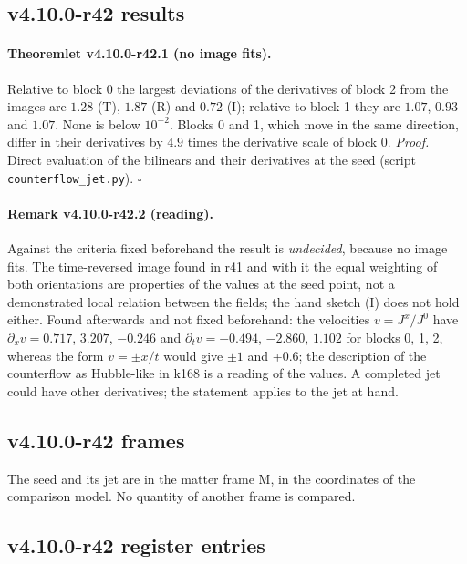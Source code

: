 \subsection*{v4.10.0-r42 results}
\label{subsec:v4100-r42-results}

\paragraph{Theoremlet v4.10.0-r42.1 (no image fits).}
Relative to block 0 the largest deviations of the derivatives of block 2 from the images are \(1.28\) (T), \(1.87\) (R) and \(0.72\) (I); relative to block 1
they are \(1.07\), \(0.93\) and \(1.07\).  None is below \(10^{-2}\).  Blocks 0 and 1, which move in the same direction, differ in their derivatives by \(4.9\)
times the derivative scale of block 0.
\emph{Proof.} Direct evaluation of the bilinears and their derivatives at the seed (script \texttt{counterflow\_\allowbreak jet.py}).  \(\square\)

\paragraph{Remark v4.10.0-r42.2 (reading).}
Against the criteria fixed beforehand the result is \emph{undecided}, because no image fits.  The time-reversed image found in r41 and with it the
equal weighting of both orientations are properties of the values at the seed point, not a demonstrated local relation between the fields; the
hand sketch (I) does not hold either.  Found afterwards and not fixed beforehand: the velocities \(v=J^x/J^0\) have \(\partial_xv=0.717\), \(3.207\), \(-0.246\)
and \(\partial_tv=-0.494\), \(-2.860\), \(1.102\) for blocks 0, 1, 2, whereas the form \(v=\pm x/t\) would give \(\pm1\) and \(\mp0.6\); the description of the
counterflow as Hubble-like in k168 is a reading of the values.  A completed jet could have other derivatives; the statement applies to the jet
at hand.

\subsection*{v4.10.0-r42 frames}
\label{subsec:v4100-r42-frames}

The seed and its jet are in the matter frame M, in the coordinates of the comparison model.  No quantity of another frame is compared.

\subsection*{v4.10.0-r42 register entries}
\label{subsec:v4100-r42-register}

